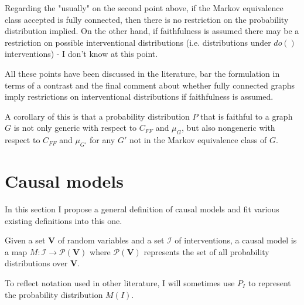 Regarding the "usually" on the second point above, if the Markov equivalence class accepted is fully connected, then there is no restriction on the probability distribution implied. On the other hand, if faithfulness is assumed there may be a restriction on possible interventional distributions (i.e. distributions under $do()$ interventions) - I don't know at this point.

All these points have been discussed in the literature, bar the formulation in terms of a contrast and the final comment about whether fully connected graphs imply restrictions on interventional distributions if faithfulness is assumed.

\begin{remark}
A corollary of this is that a probability distribution $P$ that is faithful to a graph $G$ is not only generic with respect to $C_{FF}$ and $\mu_G$, but also nongeneric with respect to $C_{FF}$ and $\mu_{G'}$ for any $G'$ not in the Markov equivalence class of $G$.
\end{remark}



\section{Causal models}

In this section I propose a general definition of causal models and fit various existing definitions into this one.

\begin{definition}
Given a set $\mathbf{V}$ of random variables and a set $\mathcal{I}$ of interventions, a causal model is a map $M:\mathcal{I}\to \mathcal{P}(\mathbf{V})$ where $\mathcal{P}(\mathbf{V})$ represents the set of all probability distributions over $\mathbf{V}$.

To reflect notation used in other literature, I will sometimes use $P_I$ to represent the probability distribution $M(I)$.
\end{definition}


